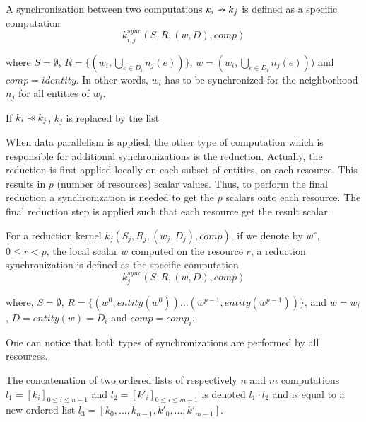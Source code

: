 \begin{mydef}
A synchronization between two computations $k_i \pprec k_j$ is defined as a specific computation 
\begin{equation*}
k_{i,j}^{sync}(S,R,(w,D),comp)
\end{equation*}
\end{mydef}
where $S=\emptyset$, $R=\{(w_i,\bigcup_{e \in D_i} n_j(e))\}$, $w=(w_i,\bigcup_{e \in D_i} n_j(e)))$ and $comp=identity$. In other words, $w_i$ has to be synchronized for the neighborhood $n_j$ for all entities of $w_i$.

\begin{mydef}
If $k_i \pprec k_j$, $k_j$ is replaced by the list
\begin{equation*}
[k_{i,j}^{sync}, k_j]
\end{equation*}
\end{mydef}

When data parallelism is applied, the other type of computation which is responsible for additional synchronizations is the reduction. Actually, the reduction is first applied locally on each subset of entities, on each resource. This results in $p$ (number of resources) scalar values. Thus, to perform the final reduction a synchronization is needed to get the $p$ scalars onto each resource. The final reduction step is applied such that each resource get the result scalar.

\begin{mydef}
For a reduction kernel $k_j(S_j,R_j,(w_j,D_j),comp)$, if we denote by $w^r$, $0 \leq r<p$, the local scalar $w$ computed on the resource $r$, a reduction synchronization is defined as the specific computation 
\begin{equation*}
k_{j}^{sync}(S,R,(w,D),comp)
\end{equation*}
\end{mydef}
where, $S=\emptyset$, $R=\{(w^0,entity(w^0)) \dots (w^{p-1},entity(w^{p-1}))\}$, and $w=w_i$, $D=entity(w)=D_i$ and $comp=comp_i$.

One can notice that both types of synchronizations are performed by all resources.

\begin{mydef}
The concatenation of two ordered lists of respectively $n$ and $m$ computations $l_1=[k_i]_{0 \leq i \leq n-1}$ and $l_2=[k'_i]_{0 \leq i \leq m-1}$ is denoted $l_1 \cdot l_2$ and is equal to a new ordered list $l_3=[k_0,\dots,k_{n-1},k'_0,\dots,k'_{m-1}]$.
\end{mydef}

